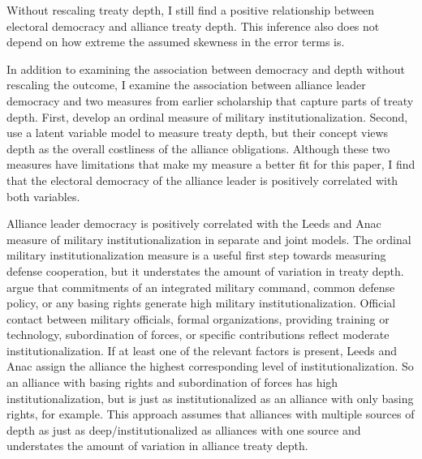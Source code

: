 \documentclass[12pt]{article}
\begin{document}
Without rescaling treaty depth, I still find a positive relationship between electoral democracy and alliance treaty depth. 
This inference also does not depend on how extreme the assumed skewness in the error terms is. 


In addition to examining the association between democracy and depth without rescaling the outcome, I examine the association between alliance leader democracy and two measures from earlier scholarship that capture parts of treaty depth. 
First, \citet{LeedsAnac2005} develop an ordinal measure of military institutionalization.
Second, \citet{BensonClinton2016} use a latent variable model to measure treaty depth, but their concept views depth as the overall costliness of the alliance obligations. 
Although these two measures have limitations that make my measure a better fit for this paper, I find that the electoral democracy of the alliance leader is positively correlated with both variables.


Alliance leader democracy is positively correlated with the Leeds and Anac measure of military institutionalization in separate and joint models.
The ordinal military institutionalization measure is a useful first step towards measuring defense cooperation, but it understates the amount of variation in treaty depth. 
\citet{LeedsAnac2005} argue that commitments of an integrated military command, common defense policy, or any basing rights generate high military institutionalization. 
Official contact between military officials, formal organizations, providing training or technology, subordination of forces, or specific contributions reflect moderate institutionalization. 
If at least one of the relevant factors is present, Leeds and Anac assign the alliance the highest corresponding level of institutionalization. 
So an alliance with basing rights and subordination of forces has high institutionalization, but is just as institutionalized as an alliance with only basing rights, for example. 
This approach assumes that alliances with multiple sources of depth as just as deep/institutionalized as alliances with one source and understates the amount of variation in alliance treaty depth.
\end{document}
